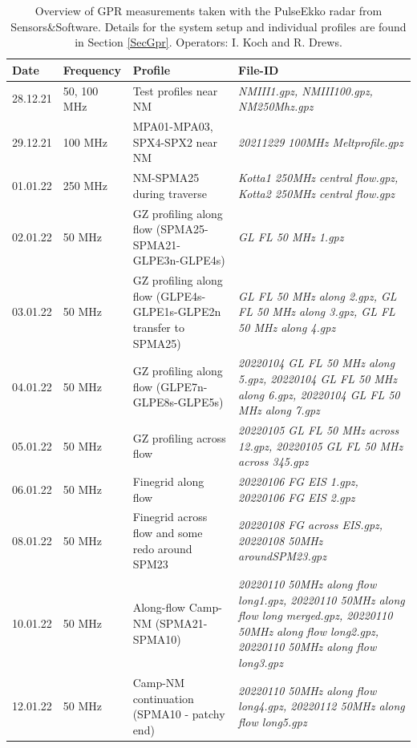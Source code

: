 \documentclass[a4paper,12pt]{article}
\begin{document}
\begin{table}[H]
  \tiny
\begin{tabular}{m{1cm} m{1 cm} m{5cm} m{7cm}}
    \rowcolor{gray!50}
    Date & Frequency & Profile & File-ID\\
    \hline
    28.12.21 & 50, 100 MHz & Test profiles near NM& \textit{NMIII1.gpz, NMIII100.gpz, NM250Mhz.gpz}\\
    29.12.21 & 100 MHz & MPA01-MPA03, SPX4-SPX2 near NM& \textit{20211229 100MHz Meltprofile.gpz}\\
    01.01.22 & 250 MHz  & NM-SPMA25 during traverse& \textit{Kotta1 250MHz central flow.gpz, Kotta2 250MHz central flow.gpz}\\
    02.01.22 & 50 MHz & GZ profiling along flow (SPMA25-SPMA21-GLPE3n-GLPE4s)& \textit{GL FL 50 MHz 1.gpz}\\
    03.01.22 & 50 MHz & GZ profiling along flow (GLPE4s-GLPE1s-GLPE2n transfer to SPMA25)& \textit{GL FL 50 MHz along 2.gpz, GL FL 50 MHz along 3.gpz, GL FL 50 MHz along 4.gpz}\\
    04.01.22 & 50 MHz & GZ profiling along flow (GLPE7n-GLPE8s-GLPE5s)& \textit{20220104 GL FL 50 MHz along 5.gpz, 20220104 GL FL 50 MHz along 6.gpz, 20220104 GL FL 50 MHz along 7.gpz}\\
    05.01.22 & 50 MHz & GZ profiling across flow & \textit{20220105 GL FL 50 MHz across 12.gpz, 20220105 GL FL 50 MHz across 345.gpz}\\
    06.01.22 & 50 MHz & Finegrid along flow & \textit{20220106 FG EIS 1.gpz, 20220106 FG EIS 2.gpz}\\
    08.01.22 & 50 MHz & Finegrid across flow and some redo around SPM23 & \textit{20220108 FG across EIS.gpz, 20220108 50MHz aroundSPM23.gpz}\\
    10.01.22 & 50 MHz & Along-flow Camp-NM (SPMA21-SPMA10)& \textit{20220110 50MHz along flow long1.gpz, 20220110 50MHz along flow long merged.gpz, 20220110 50MHz along flow long2.gpz, 20220110 50MHz along flow long3.gpz}\\
    12.01.22 & 50 MHz & Camp-NM continuation (SPMA10 - patchy end)& \textit{20220110 50MHz along flow long4.gpz, 20220112 50MHz along flow long5.gpz}\\
    \hline
  \end{tabular}
  \caption{\label{TableGPR}Overview of GPR measurements taken with the PulseEkko radar from Sensors\&Software. Details for the system setup and individual profiles are found in Section \ref{SecGpr}. Operators: I. Koch and R. Drews.}
  \label{Table_PE}
\end{table}
\end{document}
